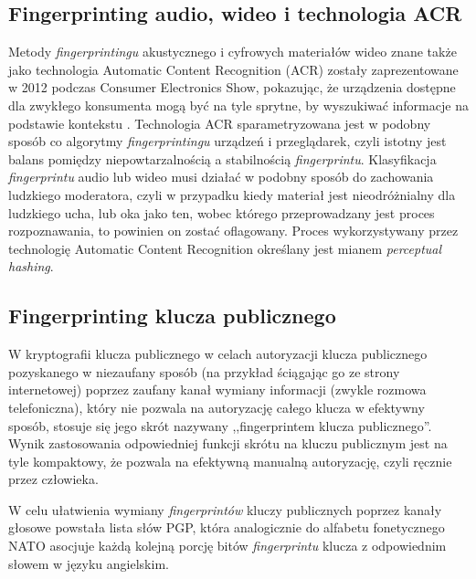 \subsection{Fingerprinting audio, wideo i technologia ACR}
Metody \emph{fingerprintingu} akustycznego i cyfrowych materiałów wideo znane
także jako technologia Automatic Content Recognition (ACR) zostały
zaprezentowane w 2012 podczas Consumer Electronics Show, pokazując, że
urządzenia dostępne dla zwykłego konsumenta mogą być na tyle sprytne, by
wyszukiwać informacje na podstawie kontekstu \cite{ng2012brief}. Technologia ACR
sparametryzowana jest w podobny sposób co algorytmy \emph{fingerprintingu}
urządzeń i przeglądarek, czyli istotny jest balans pomiędzy niepowtarzalnością a
stabilnością \emph{fingerprintu}. Klasyfikacja \emph{fingerprintu} audio lub
wideo musi działać w podobny sposób do zachowania ludzkiego moderatora, czyli w
przypadku kiedy materiał jest nieodróżnialny dla ludzkiego ucha, lub oka jako
ten, wobec którego przeprowadzany jest proces rozpoznawania, to powinien on
zostać oflagowany. Proces wykorzystywany przez technologię Automatic Content
Recognition określany jest mianem \emph{perceptual hashing}.

\subsection{Fingerprinting klucza publicznego}
W kryptografii klucza publicznego w celach autoryzacji klucza publicznego
pozyskanego w niezaufany sposób (na przykład ściągając go ze strony
internetowej) poprzez zaufany kanał wymiany informacji (zwykle rozmowa
telefoniczna), który nie pozwala na autoryzację całego klucza w efektywny
sposób, stosuje się jego skrót nazywany ,,fingerprintem klucza publicznego''.
Wynik zastosowania odpowiedniej funkcji skrótu na kluczu publicznym jest na tyle
kompaktowy, że pozwala na efektywną manualną autoryzację, czyli ręcznie przez
człowieka.

W celu ułatwienia wymiany \emph{fingerprintów} kluczy publicznych poprzez kanały
głosowe powstała lista słów PGP, która analogicznie do alfabetu fonetycznego
NATO asocjuje każdą kolejną porcję bitów \emph{fingerprintu} klucza z
odpowiednim słowem w języku angielskim.
